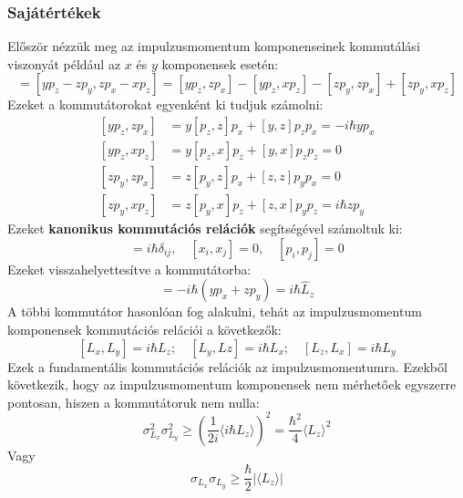 \documentclass[../main.tex]{subfiles}
\begin{document}
\subsubsection*{Sajátértékek}
Először nézzük meg az impulzusmomentum komponenseinek kommutálási viszonyát például az $x$ és $y$ komponensek esetén:
\begin{equation}
    [\hat{L}_x, \hat{L}_y] = [yp_z - z p_y, z p_x - x p_z] = [yp_z, z p_x] - [yp_z, x p_z] - [z p_y, z p_x] + [z p_y, x p_z]
\end{equation}
Ezeket a kommutátorokat egyenként ki tudjuk számolni:
\begin{equation}
    \begin{aligned}
        [y p_z, z p_x] &= y [p_z, z] p_x + [y, z] p_z p_x = -i \hbar y p_x \\
        [y p_z, x p_z] &= y [p_z, x] p_z + [y, x] p_z p_z = 0 \\
        [z p_y, z p_x] &= z [p_y, z] p_x + [z, z] p_y p_x = 0 \\
        [z p_y, x p_z] &= z [p_y, x] p_z + [z, x] p_y p_z = i \hbar z p_y
    \end{aligned}
\end{equation}
Ezeket \textbf{kanonikus kommutációs relációk} segítségével számoltuk ki:
\begin{equation}
    [x_i, p_j] = i \hbar \delta_{ij}, \quad [x_i, x_j] = 0, \quad [p_i, p_j] = 0
\end{equation}
Ezeket visszahelyettesítve a kommutátorba:
\begin{equation}
    [\hat{L}_x, \hat{L}_y] = -i \hbar (y p_x + z p_y) = i \hbar \hat{L}_z
\end{equation}
A többi kommutátor hasonlóan fog alakulni, tehát az impulzusmomentum komponensek kommutációs relációi a következők:
\begin{equation}
    \boxed{[L_x, L_y] = i \hbar L_z; \quad [L_y, Lz] = i \hbar L_x; \quad [L_z, L_x] = i \hbar L_y}
\end{equation}
Ezek a fundamentális kommutációs relációk az impulzusmomentumra. Ezekből következik, hogy az impulzusmomentum komponensek nem mérhetőek egyszerre pontosan, hiszen a kommutátoruk nem nulla:
\begin{equation}
    \sigma^2_{L_x} \sigma^2_{L_y} \geq \left(\frac{1}{2i} \langle i \hbar L_z \rangle\right)^2 = \frac{\hbar^2}{4} \langle L_z \rangle^2
\end{equation}
Vagy
\begin{equation}
    \sigma_{L_x} \sigma_{L_y} \geq \frac{\hbar}{2} |\langle L_z \rangle|
\end{equation}
\end{document}
